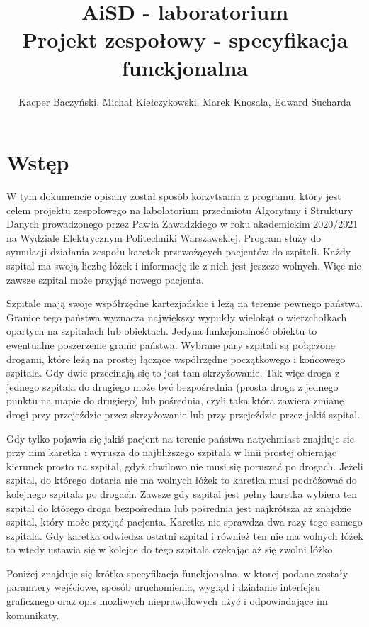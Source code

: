 \documentclass[10pt,a4paper]{article}
\title{\huge AiSD - laboratorium \\ \Large Projekt zespołowy - specyfikacja funckjonalna}
\author{Kacper Baczyński, Michał Kiełczykowski, Marek Knosala, Edward Sucharda}
\begin{document}
\maketitle

\section{Wstęp}

W tym dokumencie opisany został sposób korzytsania z programu, który jest celem projektu zespołowego na labolatorium przedmiotu Algorytmy i Struktury Danych prowadzonego przez Pawła Zawadzkiego w roku akademickim 2020/2021 na Wydziale Elektrycznym Politechniki Warszawskiej. Program służy do symulacji działania zespołu karetek przewożących pacjentów do szpitali. Każdy szpital ma swoją liczbę łóżek i informację ile z nich jest jeszcze wolnych. Więc nie zawsze szpital może przyjąć nowego pacjenta.

Szpitale mają swoje współrzędne kartezjańskie i leżą na terenie pewnego państwa. Granice tego państwa wyznacza największy wypukły wielokąt o wierzchołkach opartych na szpitalach lub obiektach. Jedyna funkcjonalność obiektu to ewentualne poszerzenie granic państwa. Wybrane pary szpitali są połączone drogami, które leżą na prostej łączące współrzędne początkowego i końcowego szpitala. Gdy dwie przecinają się to jest tam skrzyżowanie. Tak więc droga z jednego szpitala do drugiego może być bezpośrednia (prosta droga z jednego punktu na mapie do drugiego) lub pośrednia, czyli taka która zawiera zmianę drogi przy przejeździe przez skrzyżowanie lub przy przejeździe przez jakiś szpital.

Gdy tylko pojawia się jakiś pacjent na terenie państwa natychmiast znajduje sie przy nim karetka i wyrusza do najbliższego szpitala w linii prostej obierając kierunek prosto na szpital, gdyż chwilowo nie musi się poruszać po drogach. Jeżeli szpital, do którego dotarła nie ma wolnych łóżek to karetka musi podróżować do kolejnego szpitala po drogach. Zawsze gdy szpital jest pełny karetka wybiera ten szpital do którego droga bezpośrednia lub pośrednia jest najkrótsza aż znajdzie szpital, który może przyjąć pacjenta. Karetka nie sprawdza dwa razy tego samego szpitala. Gdy karetka odwiedza ostatni szpital i również ten nie ma wolnych łóżek to wtedy ustawia się w kolejce do tego szpitala czekając aż się zwolni łóżko.

Poniżej znajduje się krótka specyfikacja funckjonalna, w ktorej podane zostały paramtery wejściowe, sposób uruchomienia, wygląd i działanie interfejsu graficznego oraz opis możliwych nieprawdłowych użyć i odpowiadające im komunikaty.
\end{document}
